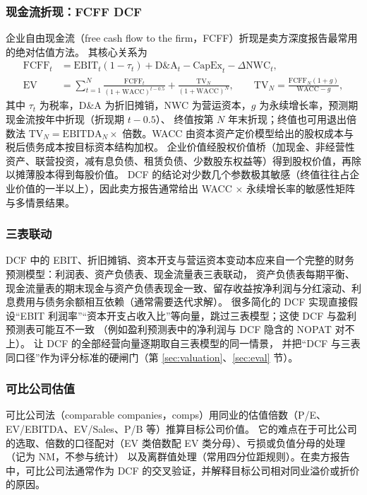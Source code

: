 \subsubsection{现金流折现：FCFF DCF}
企业自由现金流（free cash flow to the firm，FCFF）折现是卖方深度报告最常用的绝对估值方法\cite{damodaran2012investment,koller2020valuation}。
其核心关系为
\begin{align}
\text{FCFF}_t &= \text{EBIT}_t(1-\tau_t) + \text{D\&A}_t - \text{CapEx}_t - \Delta\text{NWC}_t, \label{eq:rel-fcff}\\
\text{EV} &= \sum_{t=1}^{N}\frac{\text{FCFF}_t}{(1+\text{WACC})^{t-0.5}} + \frac{\text{TV}_N}{(1+\text{WACC})^{N}}, \qquad
\text{TV}_N = \frac{\text{FCFF}_N(1+g)}{\text{WACC}-g}, \label{eq:rel-ev}
\end{align}
其中 $\tau_t$ 为税率，D\&A 为折旧摊销，NWC 为营运资本，$g$ 为永续增长率，预测期现金流按年中折现（折现期 $t-0.5$）、
终值按第 $N$ 年末折现；终值也可用退出倍数法 $\text{TV}_N=\text{EBITDA}_N\times$ 倍数。WACC 由资本资产定价模型给出的股权成本与税后债务成本按目标资本结构加权。
企业价值经股权价值桥（加现金、非经营性资产、联营投资，减有息负债、租赁负债、少数股东权益等）得到股权价值，再除以摊薄股本得到每股价值。
DCF 的结论对少数几个参数极其敏感（终值往往占企业价值的一半以上），因此卖方报告通常给出 WACC × 永续增长率的敏感性矩阵与多情景结果。

\subsubsection{三表联动}
DCF 中的 EBIT、折旧摊销、资本开支与营运资本变动本应来自一个完整的财务预测模型：利润表、资产负债表、现金流量表三表联动，
资产负债表每期平衡、现金流量表的期末现金与资产负债表现金一致、留存收益按净利润与分红滚动、利息费用与债务余额相互依赖（通常需要迭代求解）。
很多简化的 DCF 实现直接假设“EBIT 利润率”“资本开支占收入比”等向量，跳过三表模型；这使 DCF 与盈利预测表可能互不一致
（例如盈利预测表中的净利润与 DCF 隐含的 NOPAT 对不上）。\sysname{} 让 DCF 的全部经营向量逐期取自三表模型的同一情景，
并把“DCF 与三表同口径”作为评分标准的硬闸门（第 \ref{sec:valuation}、\ref{sec:eval} 节）。

\subsubsection{可比公司估值}
可比公司法（comparable companies，comps）用同业的估值倍数（P/E、EV/EBITDA、EV/Sales、P/B 等）推算目标公司价值\cite{liu2002multiples}。
它的难点在于可比公司的选取、倍数的口径配对（EV 类倍数配 EV 类分母）、亏损或负值分母的处理（记为 NM，不参与统计）
以及离群值处理（常用四分位距规则）。在卖方报告中，可比公司法通常作为 DCF 的交叉验证，并解释目标公司相对同业溢价或折价的原因。


